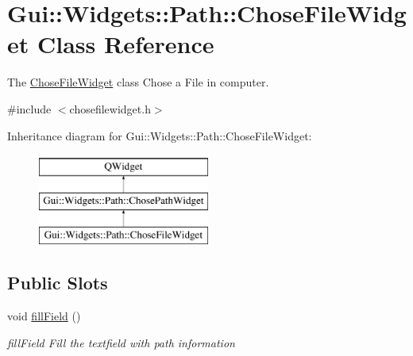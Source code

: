\hypertarget{classGui_1_1Widgets_1_1Path_1_1ChoseFileWidget}{}\section{Gui\+:\+:Widgets\+:\+:Path\+:\+:Chose\+File\+Widget Class Reference}
\label{classGui_1_1Widgets_1_1Path_1_1ChoseFileWidget}


The \hyperlink{classGui_1_1Widgets_1_1Path_1_1ChoseFileWidget}{Chose\+File\+Widget} class Chose a File in computer.  




{\ttfamily \#include $<$chosefilewidget.\+h$>$}

Inheritance diagram for Gui\+:\+:Widgets\+:\+:Path\+:\+:Chose\+File\+Widget\+:\begin{figure}[H]
\begin{center}
\leavevmode
\includegraphics[height=3.000000cm]{da/d61/classGui_1_1Widgets_1_1Path_1_1ChoseFileWidget}
\end{center}
\end{figure}
\subsection*{Public Slots}
\begin{DoxyCompactItemize}
\item 
\hypertarget{classGui_1_1Widgets_1_1Path_1_1ChoseFileWidget_af3ec8425f422362a1f4699b0cd554113}{}void \hyperlink{classGui_1_1Widgets_1_1Path_1_1ChoseFileWidget_af3ec8425f422362a1f4699b0cd554113}{fill\+Field} ()\label{classGui_1_1Widgets_1_1Path_1_1ChoseFileWidget_af3ec8425f422362a1f4699b0cd554113}

\begin{DoxyCompactList}\small\item\em fill\+Field Fill the textfield with path information \end{DoxyCompactList}\end{DoxyCompactItemize}
